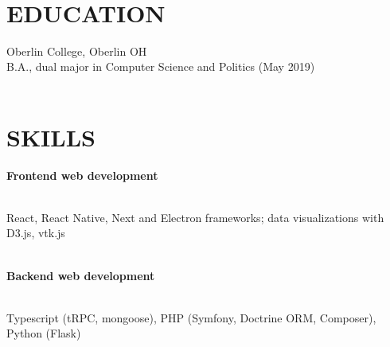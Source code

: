 \documentclass[margin]{res}
\newcommand{\Plus}{\raisebox{.4\height}{\scalebox{.6}{+}}}
\begin{document}
\begin{resume}


\vspace{-0.5em}\\
\section{EDUCATION} Oberlin College, Oberlin OH\\
B.A., dual major in Computer Science and Politics (May 2019)\\
\vspace{-2.5em}\\
\section{SKILLS}
\textbf{Frontend web development}\\
\vspace{-2.5em}\\
\begin{adjustwidth}{5mm}{}
React, React Native, Next and Electron frameworks; data visualizations with D3.js, vtk.js\\
\end{adjustwidth}
\vspace{-2em}\\

\textbf{Backend web development}\\
\vspace{-2.5em}\\
\begin{adjustwidth}{5mm}{}
Typescript (tRPC, mongoose), PHP (Symfony, Doctrine ORM, Composer), Python (Flask)\\
\end{adjustwidth}
\vspace{-2em}\\


\end{resume}
\end{document}
